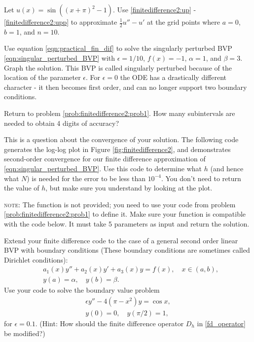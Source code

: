 
	Let $u(x) = \sin((x+\pi)^2-1)$. Use \eqref{finitedifference2:up} - \eqref{finitedifference2:upp} to approximate $\frac{1}{2}u'' - u'$ at the grid points where $a=0$, $b=1$, and $n=10$. \label{prob:finitedifference2:prob1}

Use equation \eqref{eqn:practical_fin_dif} to solve the singularly perturbed BVP \eqref{eqn:singular_perturbed_BVP} with $\epsilon = 1/10$, $f(x) = -1$, $\alpha=1$, and $\beta=3$. Graph the solution.
This BVP is called singularly perturbed because of the location of the parameter $\epsilon$.
For $\epsilon = 0$ the ODE has a drastically different character - it then becomes first order, and can no longer support two boundary conditions.
    \label{prob:finitedifference2:prob1}

Return to problem \ref{prob:finitedifference2:prob1}.   How many subintervals are needed to obtain 4 digits of accuracy?

This is a question about the convergence of your solution.
The following code generates the log-log plot in Figure \ref{fig:finitedifference2}, and demonstrates second-order convergence for our finite difference approximation of \eqref{eqn:singular_perturbed_BVP}.
Use this code to determine what $h$ (and hence what $N$) is needed for the error to be less than $10^{-4}$.
You don't need to return the value of $h$, but make sure you understand by looking at the plot.

\textsc{note}: The function  is not provided; you need to use your code from problem \ref{prob:finitedifference2:prob1} to define it.  Make sure your function is compatible with the code below.  It must take 5 parameters as input and return the solution.

	\label{prob:finitedifference2:prob2}

Extend your finite difference code to the case of a general second order linear BVP with boundary conditions (These boundary conditions are sometimes called Dirichlet conditions):
\begin{align*}
	&{ } a_1(x)y'' +a_2(x)y'+ a_3(x) y = f(x), \quad x \in (a,b),\\
	&{ } y(a) = \alpha, \quad y(b) = \beta.
\end{align*}
Use your code to solve the boundary value problem
\begin{align*}
	\epsilon y'' - 4(\pi - x^2)y = \cos x, \\
	y(0) = 0, \quad y(\pi/2) = 1,
\end{align*}
for $\epsilon = 0.1$.
\label{prob:finitedifference2:prob3}
(Hint: How should the finite difference operator $D_h$ in \eqref{fd_operator} be modified?)


